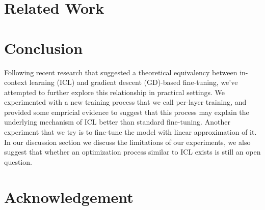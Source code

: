 \documentclass[11pt]{article}
\begin{document}
\section{Related Work}

\section{Conclusion}
Following recent research that suggested a theoretical equivalency between in-context learning (ICL) and gradient descent (GD)-based fine-tuning, we've attempted to further explore this relationship in practical settings.
We experimented with a new training process that we call per-layer training,
and provided some empricial evidence to suggest that this process may explain the underlying mechanism of ICL better than standard fine-tuning.
Another experiment that we try is to fine-tune the model with linear approximation of it.
In our discussion section we discuss the limitations of our experiments, we also suggest that whether an optimization process similar to ICL exists is still an open question.
\section{Acknowledgement}





\newpage
\appendix
\end{document}
